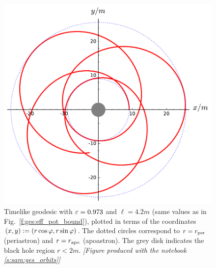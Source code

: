 \begin{figure}
\centerline{\includegraphics[height=0.4\textheight]{ges_orbit_e973_l42.pdf}}
\caption[]{\label{f:ges:orbit_e973_l42} \footnotesize
Timelike geodesic with $\varepsilon = 0.973$ and $\ell=4.2m$ (same values as in
Fig.~\ref{f:ges:eff_pot_bound}), plotted in terms of the coordinates
$(x,y) := (r\cos\varphi, r\sin\varphi)$. The dotted circles correspond to $r=r_{\rm per}$
(periastron) and $r=r_{\rm apo}$ (apoastron). The grey disk indicates the
black hole region $r<2m$. \textsl{[Figure produced with the notebook \ref{s:sam:ges_orbits}]}
}
\end{figure}


